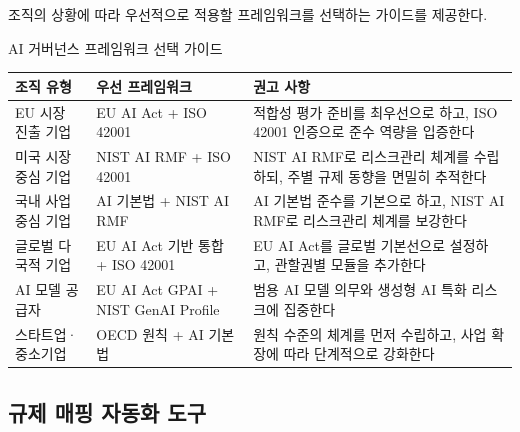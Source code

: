 조직의 상황에 따라 우선적으로 적용할 프레임워크를 선택하는 가이드를 제공한다.

\begin{practicaltool}{AI 거버넌스 프레임워크 선택 가이드}

\begin{center}
\renewcommand{\arraystretch}{1.3}
\small
\begin{tabularx}{\textwidth}{p{3cm}p{3.5cm}X}
\toprule
\textbf{조직 유형} & \textbf{우선 프레임워크} & \textbf{권고 사항} \\
\midrule
EU 시장 진출 기업 & EU AI Act + ISO 42001 & 적합성 평가 준비를 최우선으로 하고, ISO 42001 인증으로 준수 역량을 입증한다 \\
\midrule
미국 시장 중심 기업 & NIST AI RMF + ISO 42001 & NIST AI RMF로 리스크관리 체계를 수립하되, 주별 규제 동향을 면밀히 추적한다 \\
\midrule
국내 사업 중심 기업 & AI 기본법 + NIST AI RMF & AI 기본법 준수를 기본으로 하고, NIST AI RMF로 리스크관리 체계를 보강한다 \\
\midrule
글로벌 다국적 기업 & EU AI Act 기반 통합 + ISO 42001 & EU AI Act를 글로벌 기본선으로 설정하고, 관할권별 모듈을 추가한다 \\
\midrule
AI 모델 공급자 & EU AI Act GPAI + NIST GenAI Profile & 범용 AI 모델 의무와 생성형 AI 특화 리스크에 집중한다 \\
\midrule
스타트업·중소기업 & OECD 원칙 + AI 기본법 & 원칙 수준의 체계를 먼저 수립하고, 사업 확장에 따라 단계적으로 강화한다 \\
\bottomrule
\end{tabularx}
\end{center}
\end{practicaltool}

\subsection{규제 매핑 자동화 도구}

